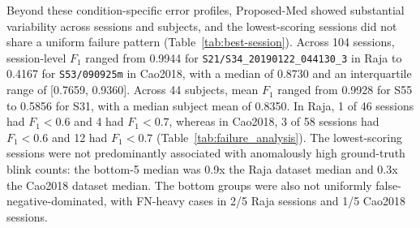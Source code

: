 Beyond these condition-specific error profiles, Proposed-Med showed substantial variability across sessions and subjects, and the lowest-scoring sessions did not share a uniform failure pattern (Table~\ref{tab:best-session}). Across 104 sessions, session-level $F_1$ ranged from 0.9944 for \texttt{S21/S34\_20190122\_044130\_3} in Raja to 0.4167 for \texttt{S53/090925m} in Cao2018, with a median of 0.8730 and an interquartile range of [0.7659, 0.9360]. Across 44 subjects, mean $F_1$ ranged from 0.9928 for S55 to 0.5856 for S31, with a median subject mean of 0.8350. In Raja, 1 of 46 sessions had $F_1<0.6$ and 4 had $F_1<0.7$, whereas in Cao2018, 3 of 58 sessions had $F_1<0.6$ and 12 had $F_1<0.7$ (Table~\ref{tab:failure_analysis}). The lowest-scoring sessions were not predominantly associated with anomalously high ground-truth blink counts: the bottom-5 median was 0.9x the Raja dataset median and 0.3x the Cao2018 dataset median. The bottom groups were also not uniformly false-negative-dominated, with FN-heavy cases in 2/5 Raja sessions and 1/5 Cao2018 sessions.
